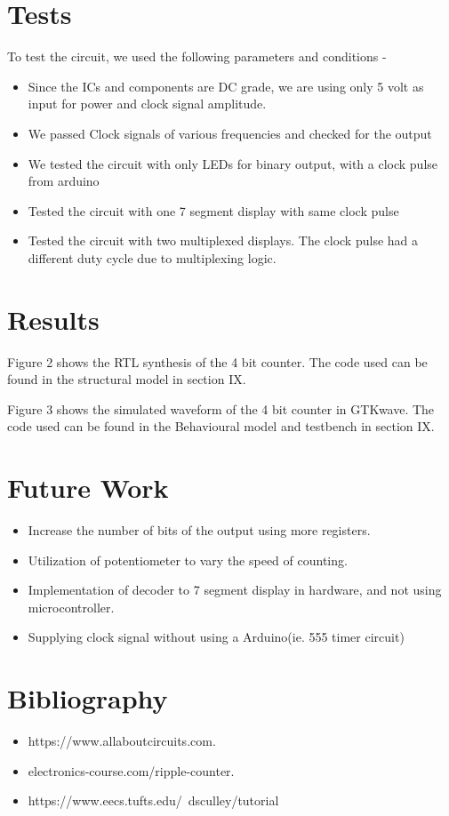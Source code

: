 \documentclass[twoside,twocolumn]{article}
\begin{document}
\section{Tests}
To test the circuit, we used the following parameters and conditions - 
\begin{itemize}
	\item Since the ICs and components are DC grade, we are using only 5 volt as input for power and clock signal amplitude.
	\item We passed Clock signals of various frequencies and checked for the output
	\item We tested the circuit with only LEDs for binary output, with a clock pulse from arduino
	\item Tested the circuit with one 7 segment display with same clock pulse
	\item Tested the circuit with two multiplexed displays. The clock pulse had a different duty cycle due to multiplexing logic.  
\end{itemize}

\section{Results}

	Figure 2 shows the RTL synthesis of the 4 bit counter.
The code used can be found in the structural model in section IX.

Figure 3 shows the simulated waveform of the 4 bit counter in GTKwave.
The code used can be found in the Behavioural model and testbench in section IX. 



\section{Future Work}
\begin{itemize}
\item Increase the number of bits of the output using more registers.
\item Utilization of potentiometer to vary the speed of  counting.
\item Implementation of decoder to 7 segment display in hardware, and not using microcontroller.
\item Supplying clock signal without using a Arduino(ie. 555 timer circuit)

\end{itemize}


\section{Bibliography} 
\begin{itemize}
\item https://www.allaboutcircuits.com.

\item electronics-course.com/ripple-counter.

\item https://www.eecs.tufts.edu/~dsculley/tutorial

\end{itemize}
\end{document}
